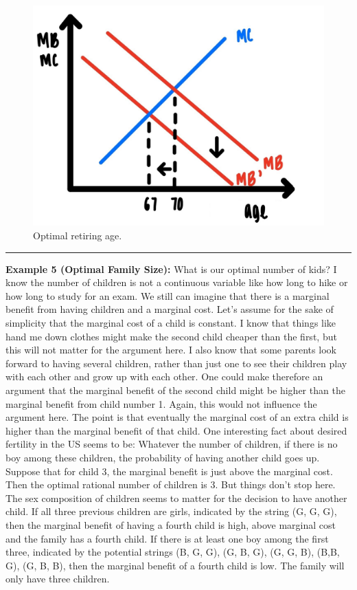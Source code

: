 \documentclass[
]{book}
\begin{document}
\begin{figure}

{\centering \includegraphics[width=0.75\linewidth]{img/rationalchoice/fig7} 

}

\caption{Optimal retiring age.}\label{fig:rationalchoice07}
\end{figure}

\begin{center}\rule{0.5\linewidth}{0.5pt}\end{center}

\textbf{Example 5 (Optimal Family Size):} What is our optimal number of kids? I know the number of children is not a continuous variable like how long to hike or how long to study for an exam. We still can imagine that there is a marginal benefit from having children and a marginal cost. Let's assume for the sake of simplicity that the marginal cost of a child is constant. I know that things like hand me down clothes might make the second child cheaper than the first, but this will not matter for the argument here. I also know that some parents look forward to having several children, rather than just one to see their children play with each other and grow up with each other. One could make therefore an argument that the marginal benefit of the second child might be higher than the marginal benefit from child number 1. Again, this would not influence the argument here. The point is that eventually the marginal cost of an extra child is higher than the marginal benefit of that child.
One interesting fact about desired fertility in the US seems to be: Whatever the number of children, if there is no boy among these children, the probability of having another child goes up. Suppose that for child 3, the marginal benefit is just above the marginal cost. Then the optimal rational number of children is 3. But things don't stop here. The sex composition of children seems to matter for the decision to have another child. If all three previous children are girls, indicated by the string (G, G, G), then the marginal benefit of having a fourth child is high, above marginal cost and the family has a fourth child. If there is at least one boy among the first three, indicated by the potential strings (B, G, G), (G, B, G), (G, G, B), (B,B, G), (G, B, B), then the marginal benefit of a fourth child is low. The family will only have three children.
\end{document}
